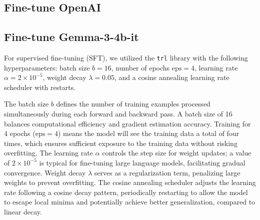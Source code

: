 \subsection{Fine-tune OpenAI} \label{app:openai-finetune}

\subsection{Fine-tune Gemma-3-4b-it} \label{app:gemma-finetune}

For supervised fine-tuning (SFT), we utilized the \texttt{trl} library with the following hyperparameters: batch size \( b = 16 \), number of epochs \( \text{eps} = 4 \), learning rate \( \alpha = 2 \times 10^{-5} \), weight decay \( \lambda = 0.05 \), and a cosine annealing learning rate scheduler with restarts.

The batch size \( b \) defines the number of training examples processed simultaneously during each forward and backward pass. A batch size of 16 balances computational efficiency and gradient estimation accuracy. Training for 4 epochs (\( \text{eps} = 4 \)) means the model will see the training data a total of four times, which ensures sufficient exposure to the training data without risking overfitting. The learning rate \( \alpha \) controls the step size for weight updates; a value of \( 2 \times 10^{-5} \) is typical for fine-tuning large language models, facilitating gradual convergence. Weight decay \( \lambda \) serves as a regularization term, penalizing large weights to prevent overfitting. The cosine annealing scheduler adjusts the learning rate following a cosine decay pattern, periodically restarting to allow the model to escape local minima and potentially achieve better generalization, compared to linear decay.
